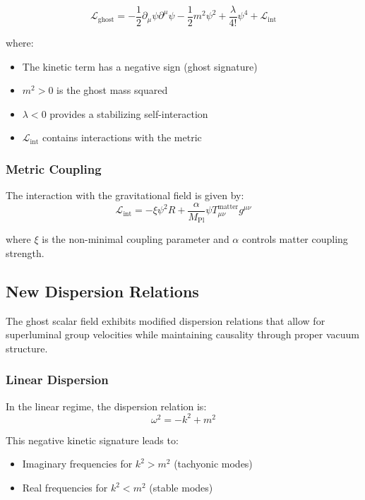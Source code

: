 \begin{equation}
\mathcal{L}_{\text{ghost}} = -\frac{1}{2}\partial_\mu \psi \partial^\mu \psi - \frac{1}{2}m^2 \psi^2 + \frac{\lambda}{4!}\psi^4 + \mathcal{L}_{\text{int}}
\end{equation}

where:
\begin{itemize}
\item The kinetic term has a negative sign (ghost signature)
\item $m^2 > 0$ is the ghost mass squared
\item $\lambda < 0$ provides a stabilizing self-interaction
\item $\mathcal{L}_{\text{int}}$ contains interactions with the metric
\end{itemize}

\subsubsection{Metric Coupling}

The interaction with the gravitational field is given by:
\begin{equation}
\mathcal{L}_{\text{int}} = -\xi \psi^2 R + \frac{\alpha}{M_{\text{Pl}}} \psi T_{\mu\nu}^{\text{matter}} g^{\mu\nu}
\end{equation}

where $\xi$ is the non-minimal coupling parameter and $\alpha$ controls matter coupling strength.

\subsection{New Dispersion Relations}

The ghost scalar field exhibits modified dispersion relations that allow for superluminal group velocities while maintaining causality through proper vacuum structure.

\subsubsection{Linear Dispersion}

In the linear regime, the dispersion relation is:
\begin{equation}
\omega^2 = -k^2 + m^2
\end{equation}

This negative kinetic signature leads to:
\begin{itemize}
\item Imaginary frequencies for $k^2 > m^2$ (tachyonic modes)
\item Real frequencies for $k^2 < m^2$ (stable modes)
\end{itemize}

